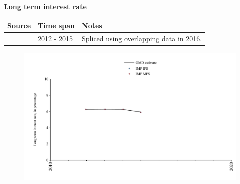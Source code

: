 \documentclass[12pt,a4paper,landscape]{article}
\begin{document}
\begin{adjustbox}{max totalsize={\paperwidth}{\paperheight},center}
\begin{minipage}[t][\textheight][t]{\textwidth}
\vspace*{0.5cm}
{}
\begin{center}
{\Large\bfseries Long term interest rate}
\end{center}
\vspace{0.5cm}
\begin{table}[H]
\centering
\small
\begin{tabular}{|l|l|l|}
\hline
\textbf{Source} & \textbf{Time span} & \textbf{Notes} \\
\hline
\rowcolor{white}\cite{IMF_MFS}& 2012 - 2015 &Spliced using overlapping data in 2016. \\
\hline
\end{tabular}
\end{table}
\begin{figure}[H]
\centering
\includegraphics[width=\textwidth,height=0.6\textheight,keepaspectratio]{graphs/SEN_ltrate.pdf}
\end{figure}
\end{minipage}
\end{adjustbox}
\end{document}
